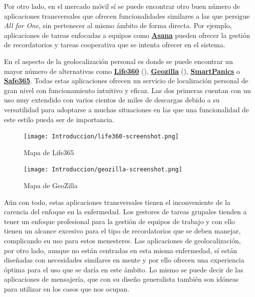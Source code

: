 Por otro lado, en el mercado móvil sí se puede encontrar otro buen número de aplicaciones transversales que ofrecen funcionalidades similares a las que persigue \emph{All for One}, sin pertenecer al mismo ámbito de forma directa. Por ejemplo, aplicaciones de tareas enfocadas a equipos como \href{https://asana.com/es}{\textbf{Asana}} pueden ofrecer la gestión de recordatorios y tareas cooperativa que se intenta ofrecer en el sistema.

En el aspecto de la geolocalización personal es donde se puede encontrar un mayor número de alternativas como \href{https://play.google.com/store/apps/details?id=com.life360.android.safetymapd&hl=es&gl=US}{\textbf{Life360}} (), \href{https://play.google.com/store/apps/details?id=com.geozilla.family&hl=es&gl=US}{\textbf{Geozilla}} (), \href{https://play.google.com/store/apps/details?id=com.softguard.android.smartpanicsNG&hl=es&gl=US}{\textbf{SmartPanics}} o \href{https://play.google.com/store/apps/details?id=com.safe365.safe365app&hl=es&gl=US}{\textbf{Safe365}}. Todas estas aplicaciones ofrecen un servicio de localización personal de gran nivel con funcionamiento intuitivo y eficaz. Las dos primeras cuentan con un uso muy extendido con varios cientos de miles de descargas debido a su versatilidad para adoptarse a muchas situaciones en las que una funcionalidad de este estilo pueda ser de importancia.

\begin{figure}[H]
    \centering
    \begin{minipage}{0.45\textwidth}
        \centering
        \texttt{[image: Introduccion/life360-screenshot.png]}
        \caption{Mapa de Life365}
        \label{fig:life365}
    \end{minipage}\hfill
    \begin{minipage}{0.45\textwidth}
        \centering
        \texttt{[image: Introduccion/geozilla-screenshot.png]}
        \caption{Mapa de GeoZilla}
        \label{fig:geozilla}
    \end{minipage}
\end{figure}
\vspace{-20pt}
Aún con todo, estas aplicaciones transversales tienen el inconveniente de la carencia del enfoque en la enfermedad. Los gestores de tareas grupales tienden a tener un enfoque profesional para la gestión de equipos de trabajo y con ello tienen un alcance excesivo para el tipo de recordatorios que se deben manejar, complicando su uso para estos menesteres. Las aplicaciones de geolocalización, por otro lado, aunque no están centradas en esta misma enfermedad, sí están diseñadas con necesidades similares en mente y por ello ofrecen una experiencia óptima para el uso que se daría en este ámbito. Lo mismo se puede decir de las aplicaciones de mensajería, que con su diseño generalista también son idóneas para utilizar en los casos que nos ocupan.

